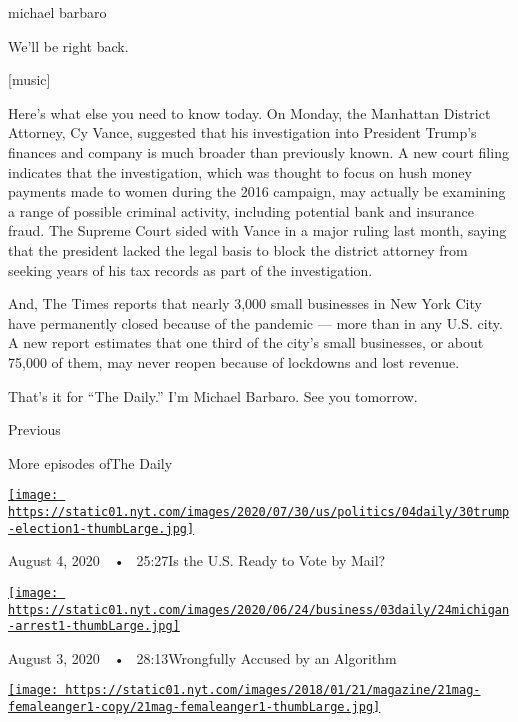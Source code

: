 michael barbaro

We'll be right back.

{[}music{]}

Here's what else you need to know today. On Monday, the Manhattan
District Attorney, Cy Vance, suggested that his investigation into
President Trump's finances and company is much broader than previously
known. A new court filing indicates that the investigation, which was
thought to focus on hush money payments made to women during the 2016
campaign, may actually be examining a range of possible criminal
activity, including potential bank and insurance fraud. The Supreme
Court sided with Vance in a major ruling last month, saying that the
president lacked the legal basis to block the district attorney from
seeking years of his tax records as part of the investigation.

And, The Times reports that nearly 3,000 small businesses in New York
City have permanently closed because of the pandemic --- more than in
any U.S. city. A new report estimates that one third of the city's small
businesses, or about 75,000 of them, may never reopen because of
lockdowns and lost revenue.

That's it for ``The Daily.'' I'm Michael Barbaro. See you tomorrow.

Previous

More episodes ofThe Daily

\href{https://www.nytimes.com/2020/08/04/podcasts/the-daily/mail-in-voting-president-trump.html?action=click\&module=audio-series-bar\&region=header\&pgtype=Article}{\texttt{[image: https://static01.nyt.com/images/2020/07/30/us/politics/04daily/30trump-election1-thumbLarge.jpg]}}

August 4, 2020~~•~ 25:27Is the U.S. Ready to Vote by Mail?

\href{https://www.nytimes.com/2020/08/03/podcasts/the-daily/algorithmic-justice-racism.html?action=click\&module=audio-series-bar\&region=header\&pgtype=Article}{\texttt{[image: https://static01.nyt.com/images/2020/06/24/business/03daily/24michigan-arrest1-thumbLarge.jpg]}}

August 3, 2020~~•~ 28:13Wrongfully Accused by an Algorithm

\href{https://www.nytimes.com/2020/08/02/podcasts/the-daily/on-female-rage.html?action=click\&module=audio-series-bar\&region=header\&pgtype=Article}{\texttt{[image: https://static01.nyt.com/images/2018/01/21/magazine/21mag-femaleanger1-copy/21mag-femaleanger1-thumbLarge.jpg]}}

